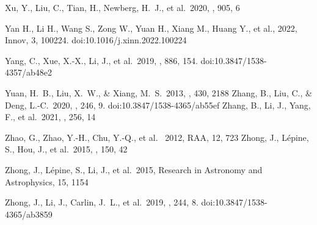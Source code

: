 \documentclass[manuscript]{aastex62}
\begin{document}
\begin{CJK*}{UTF8}{gbsn}
\begin{thebibliography}{}
 Xu, Y., Liu, C., Tian, H., Newberg, H.~J., et al.\ 2020, \apj, 905, 6


 Yan H., Li H., Wang S., Zong W., Yuan H., Xiang M., Huang Y., et al., 2022, Innov, 3, 100224. doi:10.1016/j.xinn.2022.100224

 Yang, C., Xue, X.-X., Li, J., et al.\ 2019, \apj, 886, 154. doi:10.3847/1538-4357/ab48e2

 Yuan, H.~B., Liu, X.~W., \& Xiang, M.~S.\ 2013, \mnras, 430, 2188 
 Zhang, B., Liu, C., \& Deng, L.-C.\ 2020, \apjs, 246, 9. doi:10.3847/1538-4365/ab55ef
 Zhang, B., Li, J., Yang, F., et al.\ 2021, \apjs, 256, 14

 Zhao, G., Zhao, Y.-H., Chu,
  Y.-Q., et al. \ 2012, RAA, 12, 723
 Zhong, J., L{\'e}pine, S., Hou, J., et al.\ 2015, \aj, 150, 42 

 Zhong, J., L{\'e}pine, S., Li, J., et al.\ 2015, Research in Astronomy and Astrophysics, 15, 1154 

 Zhong, J., Li, J., Carlin, J.~L., et al.\ 2019, \apjs, 244, 8. doi:10.3847/1538-4365/ab3859
\end{thebibliography}



\end{CJK*}
\end{document}
